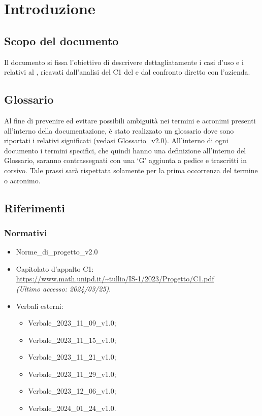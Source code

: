 \chapter{Introduzione} \label{cap:intro}
\section{Scopo del documento}
Il documento si fissa l'obiettivo di descrivere dettagliatamente i casi d’uso e i  relativi al   , ricavati dall’analisi del  C1 del   e dal confronto diretto con l'azienda.
\section{Glossario}
Al fine di prevenire ed evitare possibili ambiguità nei termini e acronimi presenti all’interno della documentazione, è stato realizzato un glossario dove sono riportati i relativi significati (vedasi Glossario\_v2.0). All’interno di ogni documento i termini specifici, che quindi hanno una definizione all’interno del Glossario, saranno contrassegnati con una ‘G’ aggiunta a pedice e trascritti in corsivo. Tale prassi sarà rispettata solamente per la prima occorrenza del termine o acronimo.
\section{Riferimenti}
\subsection{Normativi}
\begin{itemize}
    \item Norme\_di\_progetto\_v2.0
    \item Capitolato d'appalto C1: \\ \url{https://www.math.unipd.it/~tullio/IS-1/2023/Progetto/C1.pdf} \\ \textit{(Ultimo accesso: 2024/03/25)}.
    \item Verbali esterni:
        \begin{itemize}
            \item Verbale\_2023\_11\_09\_v1.0;
            \item Verbale\_2023\_11\_15\_v1.0;
            \item Verbale\_2023\_11\_21\_v1.0;
            \item Verbale\_2023\_11\_29\_v1.0;
            \item Verbale\_2023\_12\_06\_v1.0;
            \item Verbale\_2024\_01\_24\_v1.0.
        \end{itemize}
\end{itemize}

